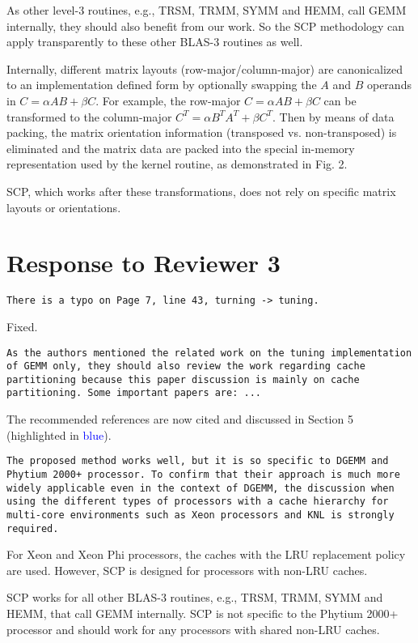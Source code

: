 \documentclass[]{article}
\begin{document}
As other level-3 routines, e.g., TRSM, TRMM, SYMM and HEMM,
call GEMM internally, they should also benefit from our work.
So the SCP methodology can apply transparently to 
these other BLAS-3 routines as well.

Internally, different matrix layouts (row-major/column-major)
are canonicalized to an implementation defined form
by optionally swapping the $A$ and $B$ operands in $C=\alpha A B+\beta C$.
For example, the row-major $C=\alpha A B+\beta C$ can be transformed to
the column-major $C^T=\alpha B^T A^T + \beta C^T$.
Then by means of data packing, the
matrix orientation information (transposed vs. non-transposed)
is eliminated and the matrix data are
packed into the special
in-memory representation used by the kernel routine, as demonstrated in Fig. 2.


SCP, which works after these transformations, 
does not rely on
specific matrix layouts or orientations.

\section{Response to Reviewer 3}

\begin{verbatim}
There is a typo on Page 7, line 43, turning -> tuning.
\end{verbatim}

Fixed.

\begin{verbatim}
As the authors mentioned the related work on the tuning implementation
of GEMM only, they should also review the work regarding cache 
partitioning because this paper discussion is mainly on cache
partitioning. Some important papers are: ...
\end{verbatim}

The recommended references are now cited and
discussed in Section 5 (highlighted
in \textcolor{blue}{blue}). 

\begin{verbatim}
The proposed method works well, but it is so specific to DGEMM and
Phytium 2000+ processor. To confirm that their approach is much more
widely applicable even in the context of DGEMM, the discussion when
using the different types of processors with a cache hierarchy for
multi-core environments such as Xeon processors and KNL is strongly
required.
\end{verbatim}

For Xeon and Xeon Phi processors, the caches with
the LRU replacement policy are used.
However,
SCP is designed for processors with non-LRU caches.

SCP works for all other BLAS-3 routines, e.g., TRSM, TRMM, SYMM and HEMM, that call GEMM internally.
SCP is not specific to the Phytium 2000+ processor and
should work for any processors with shared non-LRU caches.
\end{document}

